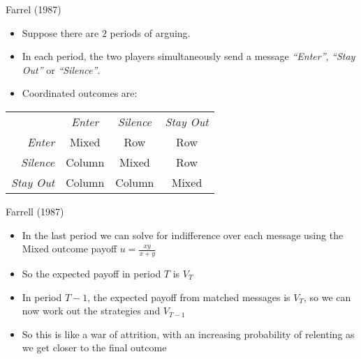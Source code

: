 \documentclass{beamer}
\begin{document}
\begin{frame}{Farrel (1987)}
	\begin{itemize}
		\item Suppose there are $2$ periods of arguing.
		\item In each period, the two players simultaneously send a message \emph{``Enter''}, \emph{``Stay Out''} or \emph{``Silence''}.
		\item Coordinated outcomes are:
	\end{itemize}
	\begin{center}
		\begin{tabular}{r|c|c|c|}
				\multicolumn{1}{r}{}& \multicolumn{1}{c}{\emph{Enter}}  & \multicolumn{1}{c}{\emph{Silence}} & \multicolumn{1}{c}{\emph{Stay Out}}\\ \cline{2-4}
				\emph{Enter} &  Mixed & Row  & Row \\ \cline{2-4}
				\emph{Silence} &  Column & Mixed &  Row\\ \cline{2-4}
				\emph{Stay Out} &  Column & Column & Mixed  \\ \cline{2-4}
		\end{tabular}
\end{center}
\end{frame}
\begin{frame}{Farrell (1987)}
	\begin{itemize}
		\item In the last period we can solve for indifference over each message using the Mixed outcome payoff $u=\tfrac{xy}{x+y}$
		\item So the expected payoff in period $T$ is $V_T$
		\item In period $T-1$, the expected payoff from matched messages is $V_T$, so we can now work out the strategies and $V_{T-1}$
		\item So this is like a war of attrition, with an increasing probability of relenting as we get closer to the final outcome
	\end{itemize}
\end{frame}
\end{document}
